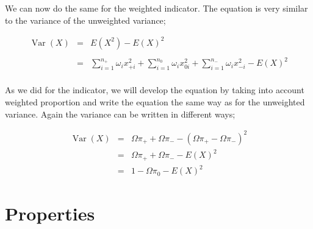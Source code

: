 \documentclass[12pt,a4paper,oneside]{book}
\DeclareMathOperator{\Var}{Var}
\begin{document}
We can now do the same for the weighted indicator. The equation is very similar to the variance of the unweighted variance;



\begin{eqnarray}
\Var(X) &=&  E\left( X^2\right) - E\left( X\right)^2 \nonumber \\ \nonumber \\
    &=& \sum_{i=1}^{n_+} \omega_i x_{+i}^2 + \sum_{i=1}^{n_0} \omega_i x_{0i}^2  + \sum_{i=1}^{n_-} \omega_i x_{-i}^2 - E(X)^2 \nonumber \\
\end{eqnarray}

As we did for the indicator, we will develop the equation by taking into account weighted proportion and write the equation the same way as for the unweighted variance. 
Again the variance can be written in different ways;

\begin{eqnarray}
\Var(X) &=& \Omega \pi_+ + \Omega \pi_- - ( \Omega \pi_+ - \Omega \pi_- )^2 \\
    &=& \Omega \pi_+ + \Omega \pi_- - E ( X )^2 \\
    &=& 1 - \Omega \pi_{0} - E(X)^2 \label{eq:var3 weighted}
\end{eqnarray}


\section{Properties}
\end{document}
